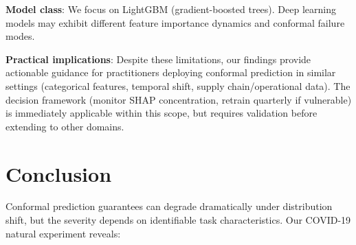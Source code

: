 \documentclass[sigconf]{acmart}
\begin{document}
\textbf{Model class}: We focus on LightGBM (gradient-boosted trees). Deep learning models may exhibit different feature importance dynamics and conformal failure modes.

\textbf{Practical implications}: Despite these limitations, our findings provide actionable guidance for practitioners deploying conformal prediction in similar settings (categorical features, temporal shift, supply chain/operational data). The decision framework (monitor SHAP concentration, retrain quarterly if vulnerable) is immediately applicable within this scope, but requires validation before extending to other domains.

\section{Conclusion}

Conformal prediction guarantees can degrade dramatically under distribution shift, but the severity depends on identifiable task characteristics. Our COVID-19 natural experiment reveals:
\end{document}
